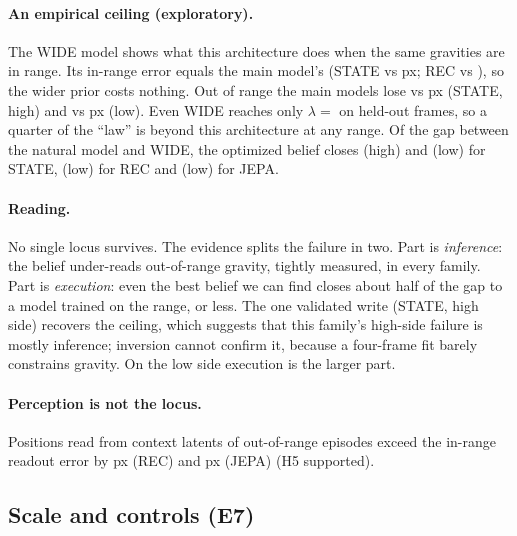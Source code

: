 \paragraph{An empirical ceiling (exploratory).} The WIDE model shows what this architecture does
when the same gravities are in range. Its in-range error equals the main model's (STATE
\StateInErrWide{} vs \StateInErr{} px; REC \RecInErrWide{} vs \RecInErr), so the wider prior costs
nothing. Out of range the main models lose \StateOodErrHi{} vs \StateOodErrWideHi{} px (STATE, high)
and \StateOodErrLo{} vs \StateOodErrWideLo{} px (low). Even WIDE reaches only $\lambda=$ \StateHoldWideHi{} on
held-out frames, so a quarter of the ``law'' is beyond this architecture at any range. Of the gap
between the natural model and WIDE, the optimized belief closes \StateGapHHi{} (high) and
\StateGapHLo{} (low) for STATE, \RecGapHLo{} (low) for REC and \JepaGapHLo{} (low) for JEPA.

\paragraph{Reading.} No single locus survives. The evidence splits the failure in two. Part is
\emph{inference}: the belief under-reads out-of-range gravity, tightly measured, in every family.
Part is \emph{execution}: even the best belief we can find closes about half of the gap to a
model trained on the range, or less. The one validated write (STATE, high side) recovers the ceiling, which suggests that this
family's high-side failure is mostly inference; inversion cannot confirm it, because a
four-frame fit barely constrains gravity. On the low side execution is the larger part.

\paragraph{Perception is not the locus.} Positions read from context latents of out-of-range
episodes exceed the in-range readout error by \RecPercExcess{} px (REC) and \JepaPercExcess{} px
(JEPA) (H5 supported).

\subsection{Scale and controls (E7)}
\label{sec:scaling}

